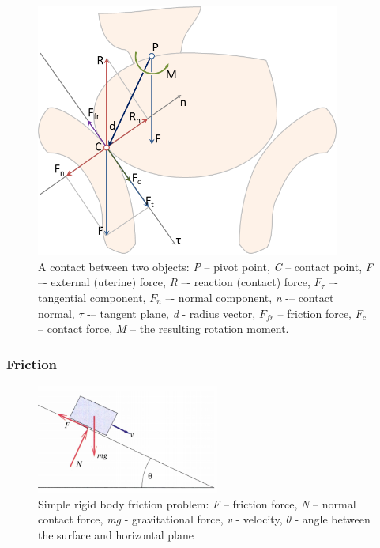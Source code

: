   \begin{figure}
  \begin{center}
  \includegraphics[width=100mm]{sections/methodology/images/basic/contact.png}
  \caption[A contact between two objects.]{\label{contact} A contact between two objects: \emph{P} -- pivot point, \emph{C} -- contact point,  \emph{F} –- external (uterine) force, \emph{R} –- reaction (contact) force, $F_\tau$ –- tangential component, $F_n$ –- normal component, \emph{n} -– contact normal, $\tau$ -– tangent plane, \emph{d} - radius vector, $F_{fr}$ -- friction force, $F_{c}$ -- contact force, $M$ -- the resulting rotation moment.}
  \end{center}
  \end{figure}


  \subsubsection{Friction}

    \begin{figure}
      \centering
        \includegraphics[width=60mm]{sections/methodology/images/basic/friction.png}
    \caption[Simple rigid body friction problem.]{\label{frictionFig} Simple rigid body friction problem: \emph{F} – friction force, \emph{N} – normal contact force, \emph{mg} - gravitational force, \emph{v} - velocity, $\theta$ - angle between the surface and horizontal plane}
    \end{figure}



